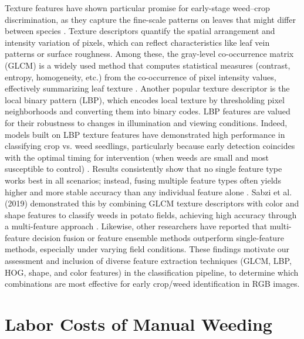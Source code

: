 \documentclass[letterpaper]{report}
\begin{document}
Texture features have shown particular promise for early-stage weed–crop discrimination, as they capture the fine-scale patterns on leaves that might differ between species \parencite{Garibaldi-Marquez2022-yn}. Texture descriptors quantify the spatial arrangement and intensity variation of pixels, which can reflect characteristics like leaf vein patterns or surface roughness. Among these, the gray-level co-occurrence matrix (GLCM) is a widely used method that computes statistical measures (contrast, entropy, homogeneity, etc.) from the co-occurrence of pixel intensity values, effectively summarizing leaf texture \parencite{Wu2021-gt,Chen2020-un}. Another popular texture descriptor is the local binary pattern (LBP), which encodes local texture by thresholding pixel neighborhoods and converting them into binary codes. LBP features are valued for their robustness to changes in illumination and viewing conditions. Indeed, models built on LBP texture features have demonstrated high performance in classifying crop vs. weed seedlings, particularly because early detection coincides with the optimal timing for intervention (when weeds are small and most susceptible to control) \parencite{Chen2020-un}. Results consistently show that no single feature type works best in all scenarios; instead, fusing multiple feature types often yields higher and more stable accuracy than any individual feature alone \parencite{Wu2021-gt,Chen2020-un}. Sabzi et al. (2019) demonstrated this by combining GLCM texture descriptors with color and shape features to classify weeds in potato fields, achieving high accuracy through a multi-feature approach \parencite{Wu2021-gt}. Likewise, other researchers have reported that multi-feature decision fusion or feature ensemble methods outperform single-feature methods, especially under varying field conditions. These findings motivate our assessment and inclusion of diverse feature extraction techniques (GLCM, LBP, HOG, shape, and color features) in the classification pipeline, to determine which combinations are most effective for early crop/weed identification in RGB images.

\section{Labor Costs of Manual Weeding}
\end{document}
